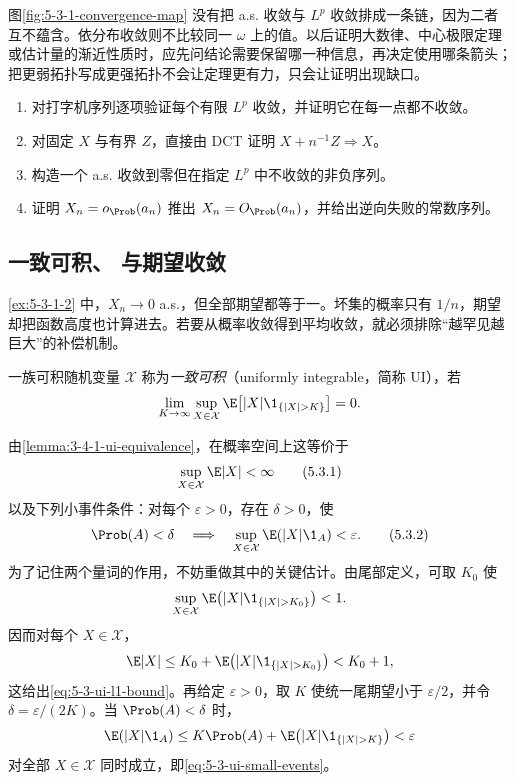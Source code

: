 \begin{remark}[反例矩阵的读法]\label{rem:5-3-1-prob-to-law}
图\ref{fig:5-3-1-convergence-map} 没有把 a.s. 收敛与 $L^p$ 收敛排成一条链，因为二者互不蕴含。依分布收敛则不比较同一 $\omega$ 上的值。以后证明大数律、中心极限定理或估计量的渐近性质时，应先问结论需要保留哪一种信息，再决定使用哪条箭头；把更弱拓扑写成更强拓扑不会让定理更有力，只会让证明出现缺口。
\end{remark}

\begin{exercise}[四种收敛的比较]\label{exercise:5-3-1-1}
\begin{enumerate}
  \item 对打字机序列逐项验证每个有限 $L^p$ 收敛，并证明它在每一点都不收敛。
  \item 对固定 $X$ 与有界 $Z$，直接由 DCT 证明 $X+n^{-1}Z\Rightarrow X$。
  \item 构造一个 a.s. 收敛到零但在指定 $L^p$ 中不收敛的非负序列。
  \item 证明 $X_n=o_\Prob(a_n)$ 推出 $X_n=O_\Prob(a_n)$，并给出逆向失败的常数序列。
\end{enumerate}
\end{exercise}


\subsection{一致可积、\Scheffe{} 与期望收敛}\label{subsec:5-3-2}

\cref{ex:5-3-1-2} 中，$X_n\to0$ a.s.，但全部期望都等于一。坏集的概率只有 $1/n$，期望却把函数高度也计算进去。若要从概率收敛得到平均收敛，就必须排除“越罕见越巨大”的补偿机制。

\begin{definition}[概率空间上的一致可积]\label{def:5-3-2-1}
一族可积随机变量 $\mathcal X$ 称为\emph{一致可积}（uniformly integrable，简称 UI），若
\[
 \lim_{K\to\infty}\sup_{X\in\mathcal X}
 \E\bigl[|X|\1_{\{|X|>K\}}\bigr]=0.
\]
\end{definition}

由\cref{lemma:3-4-1-ui-equivalence}，在概率空间上这等价于
\[
 \sup_{X\in\mathcal X}\E|X|<\infty
 \tag{5.3.1}\label{eq:5-3-ui-l1-bound}
\]
以及下列小事件条件：对每个 $\varepsilon>0$，存在 $\delta>0$，使
\[
 \Prob(A)<\delta
 \quad\Longrightarrow\quad
 \sup_{X\in\mathcal X}\E(|X|\1_A)<\varepsilon.
 \tag{5.3.2}\label{eq:5-3-ui-small-events}
\]
为了记住两个量词的作用，不妨重做其中的关键估计。由尾部定义，可取 $K_0$ 使
\[
 \sup_{X\in\mathcal X}\E\bigl(|X|\1_{\{|X|>K_0\}}\bigr)<1.
\]
因而对每个 $X\in\mathcal X$，
\[
 \E|X|
 \le K_0+\E\bigl(|X|\1_{\{|X|>K_0\}}\bigr)
 <K_0+1,
\]
这给出\eqref{eq:5-3-ui-l1-bound}。再给定 $\varepsilon>0$，取 $K$ 使统一尾期望小于
$\varepsilon/2$，并令 $\delta=\varepsilon/(2K)$。当 $\Prob(A)<\delta$ 时，
\[
 \E(|X|\1_A)
 \le K\Prob(A)+\E\bigl(|X|\1_{\{|X|>K\}}\bigr)
 <\varepsilon
\]
对全部 $X\in\mathcal X$ 同时成立，即\eqref{eq:5-3-ui-small-events}。

